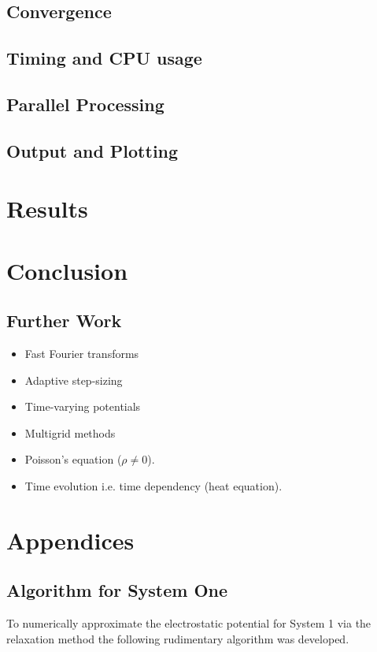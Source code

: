 \documentclass[12pt, a4paper]{article}
\begin{document}
\subsection{Convergence}


\subsection{Timing and CPU usage}

\subsection{Parallel Processing}


\subsection{Output and Plotting}


\section{Results}
%

\section{Conclusion}

\subsection{Further Work}
\begin{itemize}
\item Fast Fourier transforms
\item Adaptive step-sizing
\item Time-varying potentials
\item Multigrid methods
\item Poisson's equation ($\rho \neq 0$).
\item Time evolution i.e. time dependency (heat equation).
\end{itemize}



\appendix
\section{Appendices}
\subsection{Algorithm for System One}
To numerically approximate the electrostatic potential for System 1 via the 
relaxation method the following rudimentary algorithm was developed.
\end{document}
